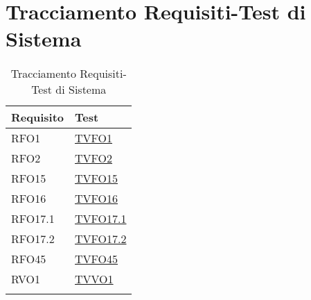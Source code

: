 \section{Tracciamento Requisiti-Test di Sistema}
\normalsize
\begin{longtable}{|>{\centering}m{5cm}|m{5cm}<{\centering}|}
\hline
\textbf{Requisito} & \textbf{Test}\\
\hline
\endhead
RFO1 & \hyperlink{TVFO1}{TVFO1}\\ \hline
RFO2 & \hyperlink{TVFO2}{TVFO2}\\ \hline
RFO15 & \hyperlink{TVFO15}{TVFO15}\\ \hline
RFO16 & \hyperlink{TVFO16}{TVFO16}\\ \hline
RFO17.1 & \hyperlink{TVFO17.1}{TVFO17.1}\\ \hline
RFO17.2 & \hyperlink{TVFO17.2}{TVFO17.2}\\ \hline
RFO45 & \hyperlink{TVFO45}{TVFO45}\\ \hline
RVO1 & \hyperlink{TVVO1}{TVVO1}\\ \hline
\caption[Tracciamento Requisiti-Test di Sistema]{Tracciamento Requisiti-Test di Sistema}
\label{tabella:requi-tv}
\end{longtable}
\clearpage



